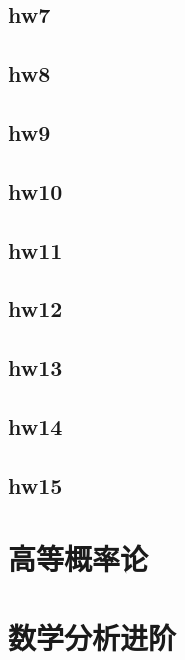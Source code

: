 \documentclass{mynote}
\begin{document}
\section{hw7}

\section{hw8}

\section{hw9}

\section{hw10}

\section{hw11}

\section{hw12}

\section{hw13}

\section{hw14}

\section{hw15}


\chapter{高等概率论}



\chapter{数学分析进阶}


\end{document}
